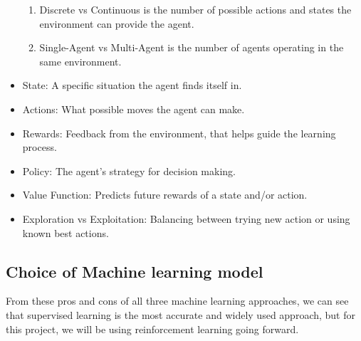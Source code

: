 \begin{itemize}
\begin{enumerate}
                  \item Discrete vs Continuous is the number of possible actions and states the environment can provide the agent.
                  \item Single-Agent vs Multi-Agent is the number of agents operating in the same environment.
            \end{enumerate}
      \item State: A specific situation the agent finds itself in.
      \item Actions: What possible moves the agent can make.
      \item Rewards: Feedback from the environment, that helps guide the learning process.
      \item Policy: The agent's strategy for decision making.
      \item Value Function: Predicts future rewards of a state and/or action.
      \item Exploration vs Exploitation: Balancing between trying new action or using known best actions.
\end{itemize}

\subsection{Choice of Machine learning model}

From these pros and cons of all three machine learning approaches, we can see that supervised learning is the most accurate and widely used approach,
but for this project, we will be using reinforcement learning going forward.


